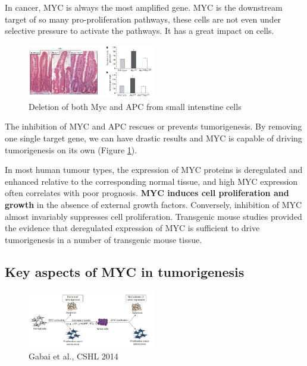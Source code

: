 In cancer, MYC is always the most amplified gene. MYC is the downstream target of so many pro-proliferation pathways, these cells are not even under selective pressure to activate the pathways.
It has a great impact on cells.

\begin{figure}
\centering
\includegraphics[width=0.5\textwidth]{../_resources/641af477cb65d73954e1ae24aab9a2ed.png}
\caption{Deletion of both Myc and APC from small intenstine cells}
\label{fig:inhi}
\end{figure}

The inhibition of MYC and APC rescues or prevents tumorigenesis. By removing one single target gene, we can have drastic results and MYC is capable of driving tumorigenesis on its own (Figure \ref{fig:inhi}).

In most human tumour types, the expression of MYC proteins is deregulated and enhanced relative to the corresponding normal tissue, and high MYC expression often correlates with poor prognosis. \textbf{MYC induces cell proliferation and growth} in the absence of external growth factors. Conversely, inhibition of MYC almost invariably suppresses cell proliferation.
Transgenic mouse studies provided the evidence that deregulated expression of MYC is sufficient to drive tumorigenesis in a number of transgenic mouse tissue.

\hypertarget{key-aspect-of-myc-in-tumorigenesis}{%
\subsection{Key aspects of MYC in tumorigenesis}\label{key-aspect-of-myc-in-tumorigenesis}}

\begin{figure}
\centering
\includegraphics[width=0.5\textwidth]{../_resources/18345a0e70ca9e50883ca61f93ad3405.png}
\caption{Gabai et al., CSHL 2014}
\label{fig:key}
\end{figure}

